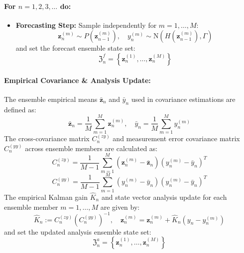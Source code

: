 \documentclass[11pt,a4paper]{article}
\begin{document}
\paragraph{For $n = 1, 2, 3, \dots$ do:}
\begin{itemize}
    \item \textbf{Forecasting Step:} Sample independently for $m = 1, \dots, M$:
    \begin{equation}
    \mathbf{z}_n^{(m)} \sim P(\mathbf{z}_{n-1}^{(m)}), \quad y_n^{(m)} \sim \mathrm{N}(H(\mathbf{z}_{n-1}^{(m)}), \Gamma)
    \end{equation}
    and set the forecast ensemble state set:
    \begin{equation}
    \mathfrak{Z}_n^f = \left\{ \mathbf{z}_n^{(1)}, \dots, \mathbf{z}_n^{(M)} \right\}
    \end{equation}
\end{itemize}

\paragraph{Empirical Covariance \& Analysis Update:}
The ensemble empirical means $\bar{\mathbf{z}}_n$ and $\bar{y}_n$ used in covariance estimations are defined as:
\begin{equation}
\bar{\mathbf{z}}_n = \frac{1}{M} \sum_{m=1}^M \mathbf{z}_n^{(m)}, \quad \bar{y}_n = \frac{1}{M} \sum_{m=1}^M y_n^{(m)}
\end{equation}
The cross-covariance matrix $C_n^{(zy)}$ and measurement error covariance matrix $C_n^{(yy)}$ across ensemble members are calculated as:
\begin{equation}
C_n^{(zy)} = \frac{1}{M-1} \sum_{m=1}^M \left(\mathbf{z}_n^{(m)} - \bar{\mathbf{z}}_n\right) \left(y_n^{(m)} - \bar{y}_n\right)^T
\end{equation}
\begin{equation}
C_n^{(yy)} = \frac{1}{M-1} \sum_{m=1}^M \left(y_n^{(m)} - \bar{y}_n\right) \left(y_n^{(m)} - \bar{y}_n\right)^T
\end{equation}
The empirical Kalman gain $\hat{K}_n$ and state vector analysis update for each ensemble member $m = 1, \dots, M$ are given by:
\begin{equation}
\hat{K}_n := C_n^{(zy)} \left(C_n^{(yy)}\right)^{-1}, \quad \mathbf{z}_n^{(m)} = \mathbf{z}_n^{(m)} + \hat{K}_n \left(y_n - y_n^{(m)}\right)
\end{equation}
and set the updated analysis ensemble state set:
\begin{equation}
\mathfrak{Z}_n^a = \left\{ \mathbf{z}_n^{(1)}, \dots, \mathbf{z}_n^{(M)} \right\}
\end{equation}
\end{document}
